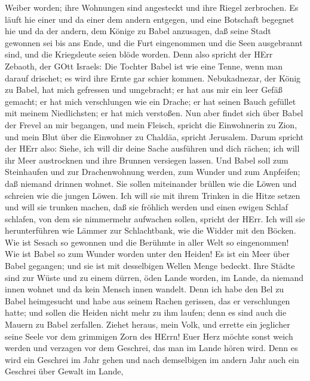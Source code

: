Weiber worden; ihre Wohnungen sind angesteckt und ihre Riegel
zerbrochen.  Es läuft hie einer und da einer dem andern
entgegen, und eine Botschaft begegnet hie und da der andern, dem Könige
zu Babel anzusagen, daß seine Stadt gewonnen sei bis ans Ende,
 und die Furt eingenommen und die Seen ausgebrannt sind,
und die Kriegsleute seien blöde worden.  Denn also spricht
der HErr Zebaoth, der GOtt Israels: Die Tochter Babel ist wie eine
Tenne, wenn man darauf drischet; es wird ihre Ernte gar schier kommen.
 Nebukadnezar, der König zu Babel, hat mich gefressen und
umgebracht; er hat aus mir ein leer Gefäß gemacht; er hat mich
verschlungen wie ein Drache; er hat seinen Bauch gefüllet mit meinem
Niedlichsten; er hat mich verstoßen.  Nun aber findet sich
über Babel der Frevel an mir begangen, und mein Fleisch, spricht die
Einwohnerin zu Zion, und mein Blut über die Einwohner zu Chaldäa,
spricht Jerusalem.  Darum spricht der HErr also: Siehe, ich
will dir deine Sache ausführen und dich rächen; ich will ihr Meer
austrocknen und ihre Brunnen versiegen lassen.  Und Babel
soll zum Steinhaufen und zur Drachenwohnung werden, zum Wunder und zum
Anpfeifen; daß niemand drinnen wohnet.  Sie sollen
miteinander brüllen wie die Löwen und schreien wie die jungen Löwen.
 Ich will sie mit ihrem Trinken in die Hitze setzen und
will sie trunken machen, daß sie fröhlich werden und einen ewigen Schlaf
schlafen, von dem sie nimmermehr aufwachen sollen, spricht der HErr.
 Ich will sie herunterführen wie Lämmer zur Schlachtbank,
wie die Widder mit den Böcken.  Wie ist Sesach so gewonnen
und die Berühmte in aller Welt so eingenommen! Wie ist Babel so zum
Wunder worden unter den Heiden!  Es ist ein Meer über Babel
gegangen; und sie ist mit desselbigen Wellen Menge bedeckt.
 Ihre Städte sind zur Wüste und zu einem dürren, öden Lande
worden, im Lande, da niemand innen wohnet und da kein Mensch innen
wandelt.  Denn ich habe den Bel zu Babel heimgesucht und
habe aus seinem Rachen gerissen, das er verschlungen hatte; und sollen
die Heiden nicht mehr zu ihm laufen; denn es sind auch die Mauern zu
Babel zerfallen.  Ziehet heraus, mein Volk, und errette ein
jeglicher seine Seele vor dem grimmigen Zorn des HErrn! 
Euer Herz möchte sonst weich werden und verzagen vor dem Geschrei, das
man im Lande hören wird. Denn es wird ein Geschrei im Jahr gehen und
nach demselbigen im andern Jahr auch ein Geschrei über Gewalt im Lande,
